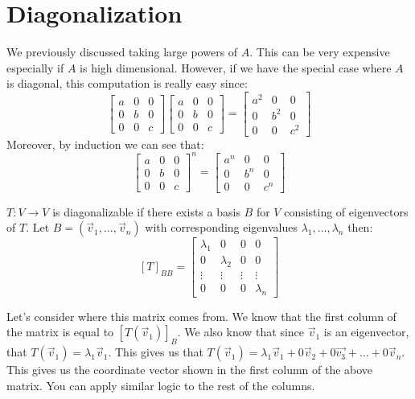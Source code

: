 \section{Diagonalization}
We previously discussed taking large powers of $A$. This can be very expensive especially if $A$ is high dimensional. However, if we have the special case where $A$ is diagonal, this computation is really easy since:
$$\begin{bmatrix}
    a & 0 & 0\\
    0 & b & 0\\
    0 & 0 & c
\end{bmatrix}\begin{bmatrix}
    a & 0 & 0\\
    0 & b & 0\\
    0 & 0 & c
\end{bmatrix}=\begin{bmatrix}
    a^2 & 0 & 0\\
    0 & b^2 & 0\\
    0 & 0 & c^2
\end{bmatrix}$$
Moreover, by induction we can see that:
$$\begin{bmatrix}
    a & 0 & 0\\
    0 & b & 0\\
    0 & 0 & c
\end{bmatrix}^n=\begin{bmatrix}
    a^n & 0 & 0\\
    0 & b^n & 0\\
    0 & 0 & c^n
\end{bmatrix}$$
\begin{definition}
    $T:V\to V$ is diagonalizable if there exists a basis $B$ for $V$ consisting of eigenvectors of $T$. Let $B=(\vec{v}_1,\ldots,\vec{v}_n)$ with corresponding eigenvalues $\lambda_1,\ldots,\lambda_n$ then:
    $$[T]_{BB}=\begin{bmatrix}
        \lambda_1 & 0 & 0 & 0\\
        0 & \lambda_2 & 0 & 0\\
        \vdots & \vdots & \vdots & \vdots\\
        0 & 0 & 0 & \lambda_n
    \end{bmatrix}$$
\end{definition}
Let's consider where this matrix comes from. We know that the first column of the matrix is equal to $[T(\vec{v}_1)]_B$. We also know that since $\vec{v}_1$ is an eigenvector, that $T(\vec{v}_1)=\lambda_1\vec{v}_1$. This gives us that $T(\vec{v}_1)=\lambda_1\vec{v}_1+0\vec{v}_2+0\vec{v_3}+\ldots+0\vec{v}_n$. This gives us the coordinate vector shown in the first column of the above matrix. You can apply similar logic to the rest of the columns.

